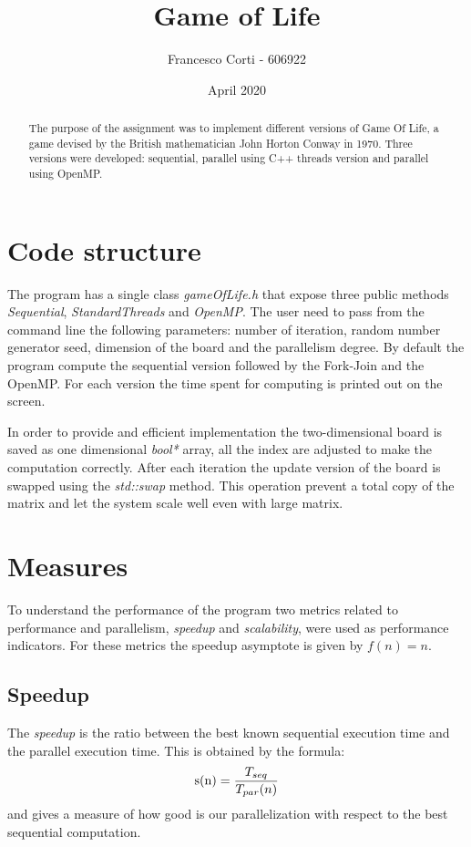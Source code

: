 \documentclass[a4paper,10pt]{article}
\title{Game of Life}
\author{Francesco Corti - 606922}
\date{April 2020}
\begin{document}
		\maketitle
		\begin{abstract}
			The purpose of the assignment was to implement different versions of Game Of Life, a game devised by the British mathematician John Horton Conway in 1970.
			Three versions were developed: sequential, parallel using C++ threads version and parallel using OpenMP. 
		\end{abstract}
\vspace{0.3cm}

\section{Code structure}
The program has a single class \textit{gameOfLife.h} that expose three public methods \textit{Sequential}, \textit{StandardThreads} and \textit{OpenMP}. The user need to pass from the command line the following parameters: number of iteration, random number generator seed, dimension of the board and the parallelism degree. By default the program compute the sequential version followed by the Fork-Join and the OpenMP. For each version the time spent for computing is printed out on the screen.

In order to provide and efficient implementation the two-dimensional board is saved as one dimensional \textit{bool*} array, all the index are adjusted to make the computation correctly. After each iteration the update version of the board is swapped using the \textit{std::swap} method. This operation prevent a total copy of the matrix and let the system scale well even with large matrix.

\section{Measures}
To understand the performance of the program two metrics related to performance and parallelism, \textit{speedup} and \textit{scalability}, were used as performance indicators. For these metrics the speedup asymptote is given by $f(n) = n $. 
\subsection{Speedup}
The \textit{speedup} is the ratio between the best known sequential execution time and the parallel execution time. This is obtained by the formula:
\begin{equation}
\textnormal{s(n)} = \frac{T_{seq}}{T_{par}(n)}
\end{equation}
 and gives a measure of how good is our parallelization with respect to the best sequential computation.
\end{document}
